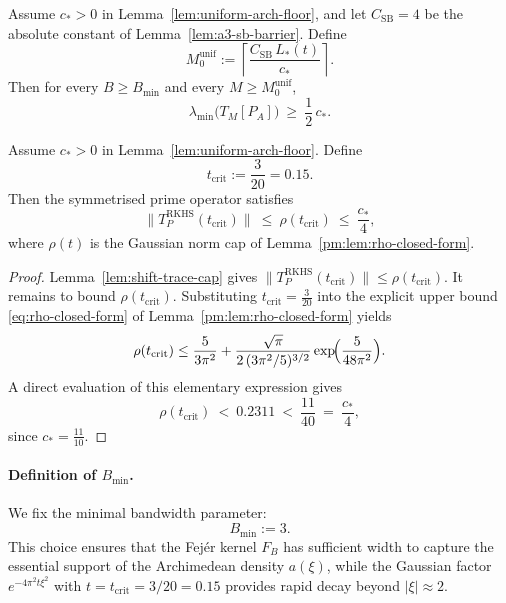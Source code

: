 \begin{corollary}\label{cor:uniform-discretisation}
Assume $c_*>0$ in Lemma~\ref{lem:uniform-arch-floor}, and let $C_{\mathrm{SB}}=4$ be the absolute constant of Lemma~\ref{lem:a3-sb-barrier}.
Define
\[
  M_{0}^{\mathrm{unif}}
  :=\left\lceil \frac{C_{\mathrm{SB}}\,L_*(t)}{c_*}\right\rceil.
\]
Then for every $B\ge B_{\min}$ and every $M\ge M_{0}^{\mathrm{unif}}$,
\[
  \lambda_{\min}\bigl(T_M[P_A]\bigr)\ \ge\ \frac{1}{2}\,c_*.
\]
\end{corollary}

\begin{corollary}\label{cor:uniform-prime-cap}
Assume $c_*>0$ in Lemma~\ref{lem:uniform-arch-floor}. Define
\[
  t_{\mathrm{crit}}:=\frac{3}{20}=0.15.
\]
Then the symmetrised prime operator satisfies
\[
  \|T_P^{\mathrm{RKHS}}(t_{\mathrm{crit}})\|\ \le\ \rho(t_{\mathrm{crit}})\ \le\ \frac{c_*}{4},
\]
where $\rho(t)$ is the Gaussian norm cap of Lemma~\ref{pm:lem:rho-closed-form}.
\end{corollary}
\begin{proof}
Lemma~\ref{lem:shift-trace-cap} gives
\(
\|T_P^{\mathrm{RKHS}}(t_{\mathrm{crit}})\|\le \rho(t_{\mathrm{crit}})
\).
It remains to bound $\rho(t_{\mathrm{crit}})$.
Substituting $t_{\mathrm{crit}}=\frac{3}{20}$ into the explicit upper bound
\eqref{eq:rho-closed-form} of Lemma~\ref{pm:lem:rho-closed-form} yields
\[
  \rho(t_{\mathrm{crit}})
  \le
  \frac{5}{3\pi^2}
  +
  \frac{\sqrt\pi}{2\,(3\pi^2/5)^{3/2}}
  \exp\!\Bigl(\frac{5}{48\pi^2}\Bigr).
\]
A direct evaluation of this elementary expression gives
\[
  \rho(t_{\mathrm{crit}})\ <\ 0.2311\ <\ \frac{11}{40}\ =\ \frac{c_*}{4},
\]
since $c_*=\frac{11}{10}$.
\end{proof}


\paragraph{Definition of $B_{\min}$.}
We fix the minimal bandwidth parameter:
\begin{equation}\label{eq:Bmin-def}
  B_{\min} := 3.
\end{equation}
This choice ensures that the Fej\'er kernel $F_B$ has sufficient width to capture the essential support of the Archimedean density $a(\xi)$, while the Gaussian factor $e^{-4\pi^2 t\xi^2}$ with $t=t_{\mathrm{crit}}=3/20=0.15$ provides rapid decay beyond $|\xi|\approx 2$.

